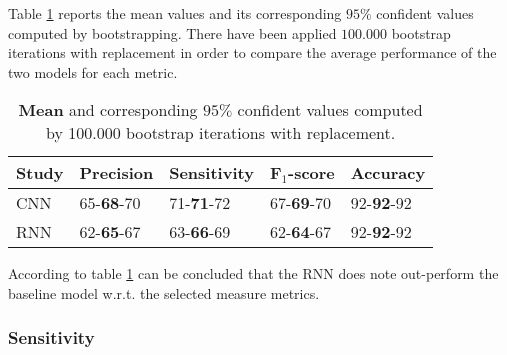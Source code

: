 
Table \ref{tab_res_2} reports the mean values and its corresponding $95\%$ confident values computed by bootstrapping. There have been applied $100.000$ bootstrap iterations with replacement in order to compare the average performance of the two models for each metric. 

\begin{table}[th!]
\centering
\begin{tabular}{l | llll}
Study & Precision & Sensitivity & F$_1$-score & Accuracy \\\hline
CNN               & 65-\textbf{68}-70 & 71-\textbf{71}-72 & 67-\textbf{69}-70 & 92-\textbf{92}-92\\
RNN               & 62-\textbf{65}-67 & 63-\textbf{66}-69 & 62-\textbf{64}-67 & 92-\textbf{92}-92
\end{tabular}
\caption{\textbf{Mean} and corresponding $95\%$ confident values computed by 100.000 bootstrap iterations with replacement.}
\label{tab_res_2}
\end{table}

According to table \ref{tab_res_2} can be concluded that the RNN does note out-perform the baseline model w.r.t. the selected measure metrics.


%



\subsubsection{Sensitivity}

